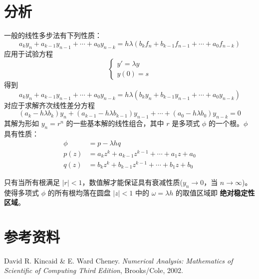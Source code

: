 \documentclass{ctexart}
\begin{document}
\section*{分析}
	一般的线性多步法有下列性质：
	\begin{equation}
		a_k y_n + a_{k-1} y_{n-1} + \cdots + a_0 y_{n-k} = h \lambda (b_k f_n + b_{k-1} f_{n-1} + \cdots + a_0 f_{n-k})
	\end{equation}
	应用于试验方程
	\begin{equation}
	\begin{cases}
		y' = \lambda y\\
		y(0) = s
	\end{cases}
	\end{equation}
	得到
	\begin{equation}
		a_k y_n + a_{k-1} y_{n-1} + \cdots + a_0 y_{n-k} = h \lambda (b_k y_n + b_{k-1} y_{n-1} + \cdots + a_0 y_{n-k})
	\end{equation}
	对应于求解齐次线性差分方程
	\begin{equation}
		(a_k - h \lambda b_k) y_n + (a_{k-1} - h \lambda b_{k-1}) y_{n-1} + \cdots + (a_0 - h \lambda b_0) y_{n-k} = 0
	\end{equation}
	其解为形如 $y_n = r^n$ 的一些基本解的线性组合，其中 $r$ 是多项式 $\phi$ 的一个根。$\phi$ 具有性质：
	\begin{align*}
		\phi & = p - \lambda h q \\
		p(z) & = a_k z^k + a_{k-1} z^{k-1} + \cdots + a_1 z + a_0 \\
		q(z) & = b_k z^k + b_{k-1} z^{k-1} + \cdots + b_1 z + b_0
	\end{align*}
	
	只有当所有根满足 $|r| < 1$，数值解才能保证具有衰减性质($y_n \rightarrow 0$，当 $n \rightarrow \infty$)。使得多项式 $\phi$ 的所有根均落在圆盘 $|z| < 1$ 中的 $\omega = \lambda h$ 的取值区域即 {\bf 绝对稳定性区域}。
	
\section*{参考资料}
	\noindent [1] David R. Kincaid \& E. Ward Cheney. {\it Numerical Analysis: Mathematics of Scientific of Computing Third Edition}, Brooks/Cole, 2002.
	
\end{document}
